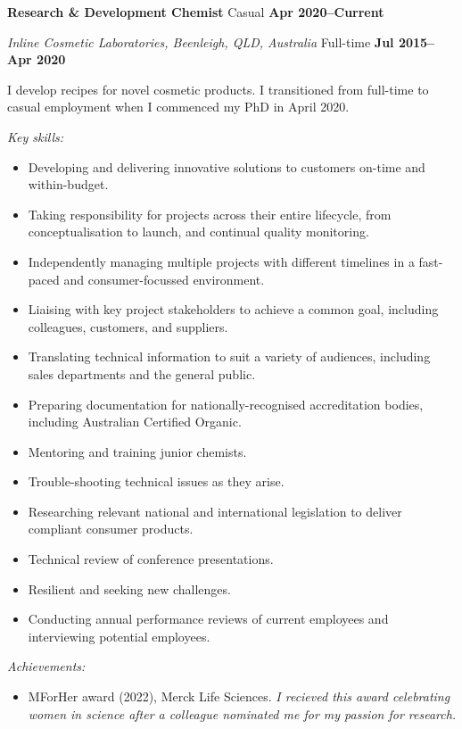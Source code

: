
\textbf{Research \& Development Chemist} \hfill Casual \textbf{Apr 2020--Current}\par
\textit{Inline Cosmetic Laboratories, Beenleigh, QLD, Australia} \hfill Full-time \textbf{Jul 2015--Apr 2020}\par
I develop recipes for novel cosmetic products. I transitioned from full-time to casual employment when I commenced my PhD in April 2020.\par
\vspace{1mm}
\textit{Key skills:} \par
\begin{itemize}
	\item Developing and delivering innovative solutions to customers on-time and within-budget.
	\item Taking responsibility for projects across their entire lifecycle, from conceptualisation to launch, and continual quality monitoring.
	\item Independently managing multiple projects with different timelines in a fast-paced and consumer-focussed environment.
	\item Liaising with key project stakeholders to achieve a common goal, including colleagues, customers, and suppliers.
	\item Translating technical information to suit a variety of audiences, including sales departments and the general public.
	\item Preparing documentation for nationally-recognised accreditation bodies, including Australian Certified Organic.
    \item Mentoring and training junior chemists.
	\item Trouble-shooting technical issues as they arise.
	\item Researching relevant national and international legislation to deliver compliant consumer products.
	\item Technical review of conference presentations.
	\item Resilient and seeking new challenges.
	\item Conducting annual performance reviews of current employees and interviewing potential employees.
\end{itemize}\par
\vspace{1mm}
\textit{Achievements:} \par
\begin{itemize}
	\item MForHer award (2022), Merck Life Sciences. \textit{I recieved this award celebrating women in science after a colleague nominated me for my passion for research.}
\end{itemize}\par